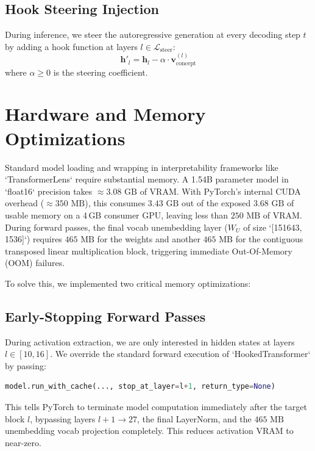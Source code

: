 \documentclass[journal, onecolumn]{IEEEtran}
\begin{document}
\subsection{Hook Steering Injection}
During inference, we steer the autoregressive generation at every decoding step $t$ by adding a hook function at layers $l \in \mathcal{L}_{\text{steer}}$:
\begin{equation}
    \bm{h}'_l = \bm{h}_l - \alpha \cdot \bm{v}_{\text{concept}}^{(l)}
    \label{eq:steering_hook}
\end{equation}
where $\alpha \ge 0$ is the steering coefficient.

\section{Hardware and Memory Optimizations}
\label{sec:hardware}

Standard model loading and wrapping in interpretability frameworks like `TransformerLens` require substantial memory. A 1.54B parameter model in `float16` precision takes $\approx 3.08 \text{ GB}$ of VRAM. With PyTorch's internal CUDA overhead ($\approx 350 \text{ MB}$), this consumes $3.43 \text{ GB}$ out of the exposed $3.68 \text{ GB}$ of usable memory on a 4\,GB consumer GPU, leaving less than $250 \text{ MB}$ of VRAM. During forward passes, the final vocab unembedding layer ($W_U$ of size `[151643, 1536]`) requires $465 \text{ MB}$ for the weights and another $465 \text{ MB}$ for the contiguous transposed linear multiplication block, triggering immediate Out-Of-Memory (OOM) failures.

To solve this, we implemented two critical memory optimizations:

\subsection{Early-Stopping Forward Passes}
During activation extraction, we are only interested in hidden states at layers $l \in [10, 16]$. We override the standard forward execution of `HookedTransformer` by passing:
\begin{lstlisting}[language=Python]
model.run_with_cache(..., stop_at_layer=l+1, return_type=None)
\end{lstlisting}
This tells PyTorch to terminate model computation immediately after the target block $l$, bypassing layers $l+1 \rightarrow 27$, the final LayerNorm, and the $465 \text{ MB}$ unembedding vocab projection completely. This reduces activation VRAM to near-zero.
\end{document}
